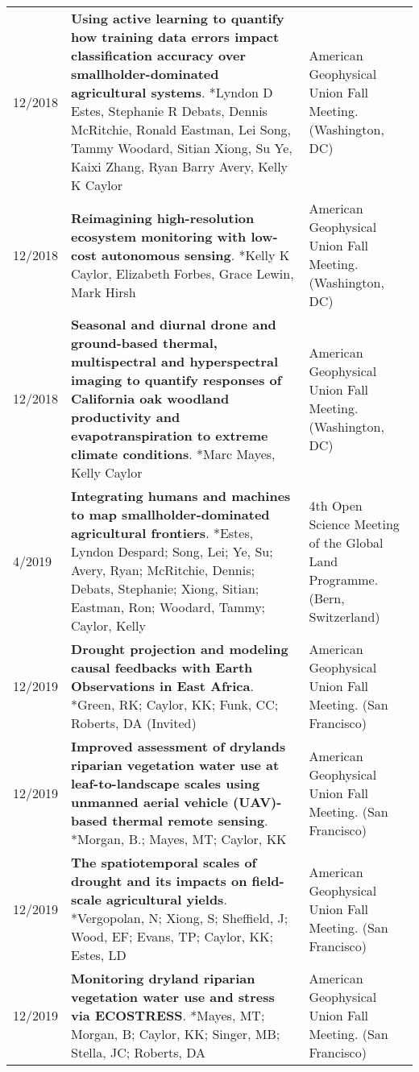\begin{longtable}{lp{9.0cm}p{4.5cm}}
12/2018 & {\bf Using active learning to quantify how training data errors impact classification accuracy over smallholder-dominated agricultural systems}. *Lyndon D Estes, Stephanie R Debats, Dennis McRitchie, Ronald Eastman, Lei Song, Tammy Woodard, Sitian Xiong, Su Ye, Kaixi Zhang, Ryan Barry Avery, Kelly K Caylor  & American Geophysical Union Fall Meeting. (Washington, DC) \\
  
12/2018 & {\bf Reimagining high-resolution ecosystem monitoring with low-cost autonomous sensing}. *Kelly K Caylor, Elizabeth Forbes, Grace Lewin, Mark Hirsh  & American Geophysical Union Fall Meeting. (Washington, DC) \\
  
12/2018 & {\bf Seasonal and diurnal drone and ground-based thermal, multispectral and hyperspectral imaging to quantify responses of California oak woodland productivity and evapotranspiration to extreme climate conditions}. *Marc Mayes, Kelly Caylor  & American Geophysical Union Fall Meeting. (Washington, DC) \\
  
4/2019 & {\bf Integrating humans and machines to map smallholder-dominated agricultural frontiers}. *Estes, Lyndon Despard; Song, Lei; Ye, Su; Avery, Ryan; McRitchie, Dennis; Debats, Stephanie; Xiong, Sitian; Eastman, Ron; Woodard, Tammy; Caylor, Kelly  & 4th Open Science Meeting of the Global Land Programme. (Bern, Switzerland) \\
  
12/2019 & {\bf Drought projection and modeling causal feedbacks with Earth Observations in East Africa}. *Green, RK; Caylor, KK; Funk, CC; Roberts, DA  (Invited)  & American Geophysical Union Fall Meeting. (San Francisco) \\
  
12/2019 & {\bf Improved assessment of drylands riparian vegetation water use at leaf-to-landscape scales using unmanned aerial vehicle (UAV)-based thermal remote sensing}. *Morgan, B.; Mayes, MT; Caylor, KK  & American Geophysical Union Fall Meeting. (San Francisco) \\
  
12/2019 & {\bf The spatiotemporal scales of drought and its impacts on field-scale agricultural yields}. *Vergopolan, N; Xiong, S; Sheffield, J; Wood, EF; Evans, TP; Caylor, KK; Estes, LD  & American Geophysical Union Fall Meeting. (San Francisco) \\
  
12/2019 & {\bf Monitoring dryland riparian vegetation water use and stress via ECOSTRESS}. *Mayes, MT; Morgan, B; Caylor, KK; Singer, MB; Stella, JC; Roberts, DA  & American Geophysical Union Fall Meeting. (San Francisco) \\
  

\end{longtable}
